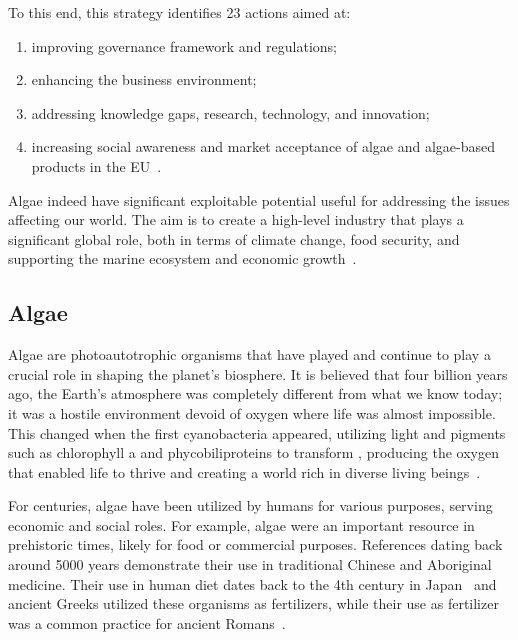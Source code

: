 To this end, this strategy identifies \num{23} actions aimed at:
\begin{enumerate}
\item improving governance framework and regulations;
\item enhancing the business environment;
\item addressing knowledge gaps, research, technology, and innovation;
\item increasing social awareness and market acceptance of algae and algae-based products in the EU~\parencite{kuech_future_2023}.
\end{enumerate}

Algae indeed have significant exploitable potential useful for addressing the issues affecting our world. The aim is to create a high-level industry that plays a significant global role, both in terms of climate change, food security, and supporting the marine ecosystem and economic growth~\parencite{seaweed_manifesto}.

\subsection{Algae}
Algae are photoautotrophic organisms that have played and continue to play a crucial role in shaping the planet's biosphere. It is believed that four billion years ago, the Earth's atmosphere was completely different from what we know today; it was a hostile environment devoid of oxygen where life was almost impossible. This changed when the first cyanobacteria appeared, utilizing light and pigments such as chlorophyll a and phycobiliproteins to transform , producing the oxygen that enabled life to thrive and creating a world rich in diverse living beings~\parencite{mayfield_algae_2021}.

For centuries, algae have been utilized by humans for various purposes, serving economic and social roles. For example, algae were an important resource in prehistoric times, likely for food or commercial purposes. References dating back around \num{5000} years demonstrate their use in traditional Chinese and Aboriginal medicine. Their use in human diet dates back to the 4th\zxriv{} century in Japan~\parencite{jacquin_Selected_2014} and ancient Greeks utilized these organisms as fertilizers, while their use as fertilizer was a common practice for ancient Romans~\parencite{jacquin_Selected_2014}.

